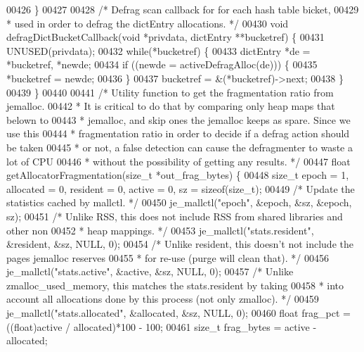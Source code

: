 \begin{DoxyCode}
00426 \}
00427 
00428 \textcolor{comment}{/* Defrag scan callback for for each hash table bicket,}
00429 \textcolor{comment}{ * used in order to defrag the dictEntry allocations. */}
00430 \textcolor{keywordtype}{void} defragDictBucketCallback(\textcolor{keywordtype}{void} *privdata, dictEntry **bucketref) \{
00431     UNUSED(privdata);
00432     \textcolor{keywordflow}{while}(*bucketref) \{
00433         dictEntry *de = *bucketref, *newde;
00434         \textcolor{keywordflow}{if} ((newde = activeDefragAlloc(de))) \{
00435             *bucketref = newde;
00436         \}
00437         bucketref = &(*bucketref)->next;
00438     \}
00439 \}
00440 
00441 \textcolor{comment}{/* Utility function to get the fragmentation ratio from jemalloc.}
00442 \textcolor{comment}{ * It is critical to do that by comparing only heap maps that belown to}
00443 \textcolor{comment}{ * jemalloc, and skip ones the jemalloc keeps as spare. Since we use this}
00444 \textcolor{comment}{ * fragmentation ratio in order to decide if a defrag action should be taken}
00445 \textcolor{comment}{ * or not, a false detection can cause the defragmenter to waste a lot of CPU}
00446 \textcolor{comment}{ * without the possibility of getting any results. */}
00447 \textcolor{keywordtype}{float} getAllocatorFragmentation(size\_t *out\_frag\_bytes) \{
00448     size\_t epoch = 1, allocated = 0, resident = 0, active = 0, sz = \textcolor{keyword}{sizeof}(size\_t);
00449     \textcolor{comment}{/* Update the statistics cached by mallctl. */}
00450     je\_mallctl(\textcolor{stringliteral}{"epoch"}, &epoch, &sz, &epoch, sz);
00451     \textcolor{comment}{/* Unlike RSS, this does not include RSS from shared libraries and other non}
00452 \textcolor{comment}{     * heap mappings. */}
00453     je\_mallctl(\textcolor{stringliteral}{"stats.resident"}, &resident, &sz, NULL, 0);
00454     \textcolor{comment}{/* Unlike resident, this doesn't not include the pages jemalloc reserves}
00455 \textcolor{comment}{     * for re-use (purge will clean that). */}
00456     je\_mallctl(\textcolor{stringliteral}{"stats.active"}, &active, &sz, NULL, 0);
00457     \textcolor{comment}{/* Unlike zmalloc\_used\_memory, this matches the stats.resident by taking}
00458 \textcolor{comment}{     * into account all allocations done by this process (not only zmalloc). */}
00459     je\_mallctl(\textcolor{stringliteral}{"stats.allocated"}, &allocated, &sz, NULL, 0);
00460     \textcolor{keywordtype}{float} frag\_pct = ((\textcolor{keywordtype}{float})active / allocated)*100 - 100;
00461     size\_t frag\_bytes = active - allocated;

\end{DoxyCode}
